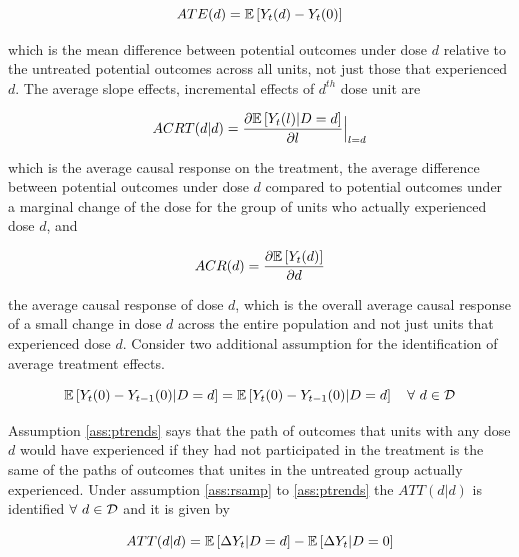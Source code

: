 \documentclass[11pt]{article}
\begin{document}
\begin{equation}
    ATE(d) = \mathbb{E} \left[ Y_t (d)  - Y_t (0) \right]
\end{equation}

which is the mean difference between potential outcomes under dose $d$ relative to the untreated potential outcomes across all units, not just those that experienced $d$. The average slope effects, incremental effects of $d^{th}$ dose unit are

\begin{equation}
    ACRT(d|d) = \frac{\partial \mathbb{E}\left[ Y_{t}(l) | D = d \right]}{\partial l}\Big\vert_{l=d}
\end{equation}

which is the average causal response on the treatment, the average difference between potential outcomes under dose $d$ compared to potential outcomes under a marginal change of the dose for the group of units who actually experienced dose $d$, and

\begin{equation}
    ACR(d) = \frac{\partial \mathbb{E}\left[ Y_{t}(d) \right]}{\partial d}
\end{equation}

the average causal response of dose $d$, which is the overall average causal response of a small change in dose $d$ across the entire population and not just units that experienced dose $d$. Consider two additional assumption for the identification of average treatment effects.

\begin{assumption}\label{ass:ptrends}
    \begin{equation}
        \mathbb{E}\left[ Y_{t} (0) - Y_{t-1} (0) | D = d \right] = \mathbb{E}\left[ Y_{t} (0) - Y_{t-1} (0) | D = d \right] \quad \forall \ d \in \mathcal{D}
    \end{equation}
\end{assumption}

Assumption \ref{ass:ptrends} says that the path of outcomes that units with any dose $d$ would have experienced if they had not participated in the treatment is the same of the paths of outcomes that unites in the untreated group actually experienced. Under assumption \ref{ass:rsamp} to \ref{ass:ptrends} the $ATT(d|d)$ is identified $\forall \ d \in \mathcal{D}$ and it is given by

\begin{equation}
    ATT(d|d) = \mathbb{E}\left[ \Delta Y_{t} | D = d \right] - \mathbb{E}\left[ \Delta Y_{t} | D = 0 \right]
\end{equation}
\end{document}
